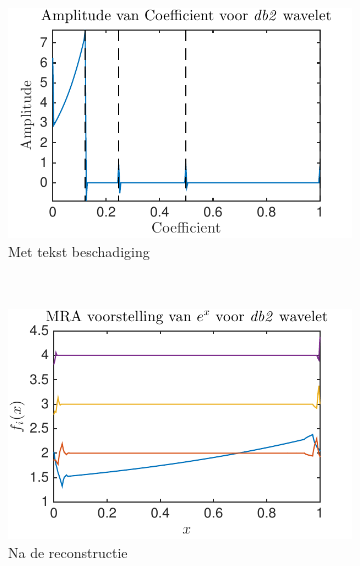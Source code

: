 \begin{figure}
\begin{subfigure}[b]{0.45\textwidth}
        \includegraphics[width=\textwidth]{../src/denoising/db2_noNoise/coef_exp_db2_3}
        \caption{Met tekst beschadiging}
        \label{fig:tiger}
    \end{subfigure}
    ~ %
    \begin{subfigure}[b]{0.45\textwidth}
        \includegraphics[width=\textwidth]{../src/denoising/db2_noNoise/MRA_exp_db2_3}
        \caption{Na de reconstructie}
        \label{fig:mouse}
    \end{subfigure}
    \begin{subfigure}[b]{0.45\textwidth}

\end{subfigure}
\end{figure}
